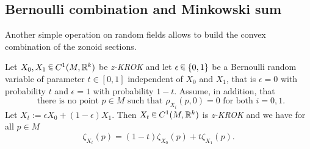 \documentclass[10pt]{amsart}
\theoremstyle{definition}\newtheorem{defi}[theo]{Definition}\newtheorem{rema}[theo]{Remark}\newtheorem{exam}[theo]{Example}\newtheorem{exem}[theo]{Example}\newtheorem{nota}[theo]{Notation}
\newcommand{\R}{\mathbb{R}}
\newcommand{\zkrok}{\emph{z-KROK}\xspace}
\newcommand*\randin{
\mathchoice {\raisebox{-.35ex}{$\displaystyle{^\subset}$}\mkern-11.5mu\raisebox{+.45ex}{$\displaystyle{_\subset}$}} {\mkern+1mu\raisebox{-.27ex}{$\textstyle{^\subset}$}\mkern-11.7mu\raisebox{+.45ex}{$\textstyle{_\subset}$}} {\raisebox{.35ex}{$\scriptstyle\subset$}\mkern-14mu\raisebox{-.15ex}{$\scriptstyle\subset$}} {\raisebox{.3ex}{$\scriptscriptstyle\subset$}\mkern-13.5mu\raisebox{-.10ex}{$\scriptscriptstyle\subset$}}}
\begin{document}
\subsection{Bernoulli combination and Minkowski sum}

Another simple operation on random fields allows to build the convex combination of the zonoid sections.

\begin{prop}\label{prop:bern}
Let $X_0,X_1\,\randin\, C^1(M,\R^k)$ be {\zkrok} and let $\epsilon\,\randin\,\{0,1\}$ be a Bernoulli random variable of parameter $t\in[0,1]$ independent of $X_0$ and $X_1$, that is $\epsilon=0$ with probability $t$ and $\epsilon=1$ with probability $1-t$. Assume, in addition, that
\begin{equation}\label{hyp:bern}
\tag{$*$}\ \text{ there is no point }p\in M\text{ such that }\rho_{X_i}(p,0)=0\text{ for both }i=0,1.
\end{equation}
Let $X_t:=\epsilon X_0 + (1-\epsilon)X_1$. Then $X_t\,\randin\, C^1(M,\R^k)$ is {\zkrok} and we have for all $p\in M$
\begin{equation*}
\zeta_{X_t}(p)=(1-t)\zeta_{X_0}(p)+t\zeta_{X_1}(p).
\end{equation*}
\end{prop}
\end{document}
